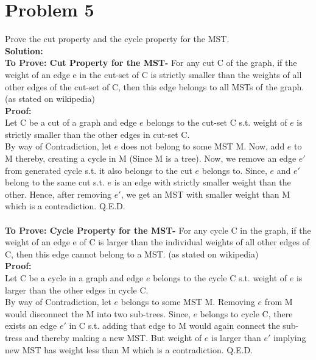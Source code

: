\documentclass{article}
\begin{document}
\section*{Problem 5}
Prove the cut property and the cycle property for the MST.
\vspace{1mm} \\
\textbf{Solution:} \\
\textbf{To Prove: Cut Property for the MST-} For any cut C of the graph, if the weight of an edge e in the cut-set of C is strictly smaller than the weights of all other edges of the cut-set of C, then this edge belongs to all MSTs of the graph. (as stated on wikipedia) \\
\textbf{Proof:} \\
Let C be a cut of a graph and edge $e$ belongs to the cut-set C s.t. weight of $e$ is strictly smaller than the other edges in cut-set C. \\
By way of Contradiction, let $e$ does not belong to some MST M. Now, add $e$ to M thereby, creating a cycle in M (Since M is a tree). Now, we remove an edge $e'$ from generated cycle s.t. it also belongs to the cut $e$ belongs to. Since, $e$ and $e'$ belong to the same cut s.t. $e$ is an edge with strictly smaller weight than the other. Hence, after removing $e'$, we get an MST with smaller weight than M which is a contradiction. Q.E.D. \\
\vspace{0.5mm} \\
\textbf{To Prove: Cycle Property for the MST-} For any cycle C in the graph, if the weight of an edge e of C is larger than the individual weights of all other edges of C, then this edge cannot belong to a MST. (as stated on wikipedia) \\
\textbf{Proof:} \\
Let C be a cycle in a graph and edge $e$ belongs to the cycle C s.t. weight of $e$ is larger than the other edges in cycle C. \\
By way of Contradiction, let $e$ belongs to some MST M. Removing $e$ from M would disconnect the M into two sub-trees. Since, $e$ belongs to cycle C, there exists an edge $e'$ in C s.t. adding that edge to M would again connect the sub-tress and thereby making a new MST. But weight of $e$ is larger than $e'$ implying new MST has weight less than M which is a contradiction. Q.E.D.
\end{document}
